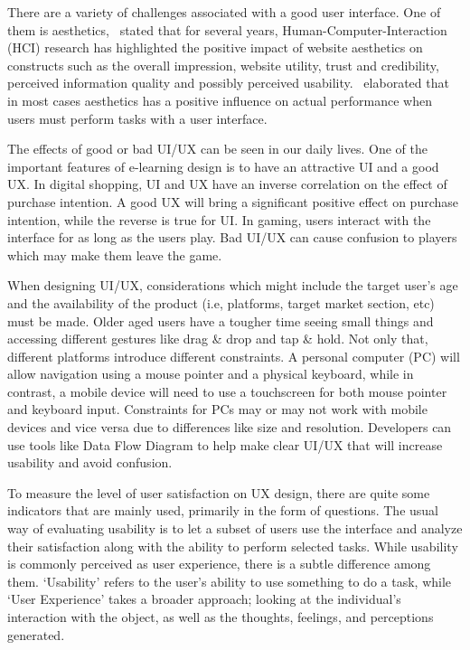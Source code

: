 \documentclass[conference]{IEEEtran}
\begin{document}
There are a variety of challenges associated with a good user interface. One of them is aesthetics,~\cite{GlenaH} stated that for several years, Human-Computer-Interaction (HCI) research has highlighted the positive impact of website aesthetics on constructs such as the overall impression, website utility, trust and credibility, perceived information quality and possibly perceived usability.~\cite{SchmidtWolff+2018+41+55} elaborated that in most cases aesthetics has a positive influence on actual performance when users must perform tasks with a user interface.

The effects of good or bad UI/UX can be seen in our daily lives. One of the important features of e-learning design is to have an attractive UI and a good UX\cite{Handayani2020GamifiedLP}. In digital shopping, UI and UX have an inverse correlation on the effect of purchase intention\cite{Watulingas}. A good UX will bring a significant positive effect on purchase intention, while the reverse is true for UI\cite{Watulingas}. In gaming, users interact with the interface for as long as the users play. Bad UI/UX can cause confusion to players which may make them leave the game\cite{Kurniawan2021UIUXMG}.

When designing UI/UX, considerations which might include the target user's age and the availability of the product (i.e, platforms, target market section, etc) must be made. Older aged users have a tougher time seeing small things and accessing different gestures like drag \& drop and tap \& hold\cite{Salman2018UsabilityEO}. Not only that, different platforms introduce different constraints. A personal computer (PC) will allow navigation using a mouse pointer and a physical keyboard, while in contrast, a mobile device will need to use a touchscreen for both mouse pointer and keyboard input. Constraints for PCs may or may not work with mobile devices and vice versa due to differences like size and resolution\cite{Garca2017ValidationON}. Developers can use tools like Data Flow Diagram to help make clear UI/UX that will increase usability and avoid confusion\cite{Wulandari2017DesignDF}.

To measure the level of user satisfaction on UX design, there are quite some indicators that are mainly used, primarily in the form of questions. The usual way of evaluating usability is to let a subset of users use the interface and analyze their satisfaction along with the ability to perform selected tasks\cite{Pastushenko}. While usability is commonly perceived as user experience, there is a subtle difference among them. `Usability' refers to the user's ability to use something to do a task, while `User Experience' takes a broader approach; looking at the individual's interaction with the object, as well as the thoughts, feelings, and perceptions generated\cite{Erlinda}.
\end{document}
